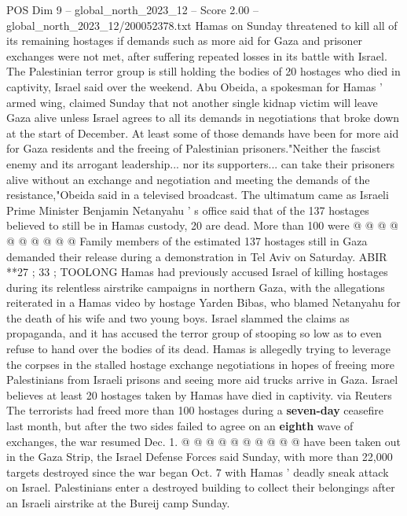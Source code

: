 \begin{textsample}{POS Dim 9 – global\_north\_2023\_12 – Score 2.00 – global\_north\_2023\_12/200052378.txt}  \label{ex:f9_pos_163}
Hamas on Sunday threatened to kill all of its remaining hostages if demands such as more aid for Gaza and prisoner exchanges were not met, after suffering repeated losses in its battle with Israel.
The Palestinian terror group is still holding the bodies of 20 hostages who died in captivity, Israel said over the weekend.
Abu Obeida, a spokesman for Hamas ' armed wing, claimed Sunday that not another single kidnap victim will leave Gaza alive unless Israel agrees to all its demands in negotiations that broke down at the start of December.
At least some of those demands have been for more aid for Gaza residents and the freeing of Palestinian prisoners."Neither the fascist enemy and its arrogant leadership... nor its supporters... can take their prisoners alive without an exchange and negotiation and meeting the demands of the resistance,"Obeida said in a televised broadcast.
The ultimatum came as Israeli Prime Minister Benjamin Netanyahu ' s office said that of the 137 hostages believed to still be in Hamas custody, 20 are dead.
More than 100 were @ @ @ @ @ @ @ @ @ @ Family members of the estimated 137 hostages still in Gaza demanded their release during a demonstration in Tel Aviv on Saturday.
ABIR **27 ; 33 ; TOOLONG Hamas had previously accused Israel of killing hostages during its relentless airstrike campaigns in northern Gaza, with the allegations reiterated in a Hamas video by hostage Yarden Bibas, who blamed Netanyahu for the death of his wife and two young boys.
Israel slammed the claims as propaganda, and it has accused the terror group of stooping so low as to even refuse to hand over the bodies of its dead.
Hamas is allegedly trying to leverage the corpses in the stalled hostage exchange negotiations in hopes of freeing more Palestinians from Israeli prisons and seeing more aid trucks arrive in Gaza.
Israel believes at least 20 hostages taken by Hamas have died in captivity. via Reuters The terrorists had freed more than 100 hostages during a \textbf{seven-day} ceasefire last month, but after the two sides failed to agree on an \textbf{eighth} wave of exchanges, the war resumed Dec. 1. @ @ @ @ @ @ @ @ @ @ have been taken out in the Gaza Strip, the Israel Defense Forces said Sunday, with more than 22,000 targets destroyed since the war began Oct. 7 with Hamas ' deadly sneak attack on Israel.
Palestinians enter a destroyed building to collect their belongings after an Israeli airstrike at the Bureij camp Sunday.

\end{textsample}
